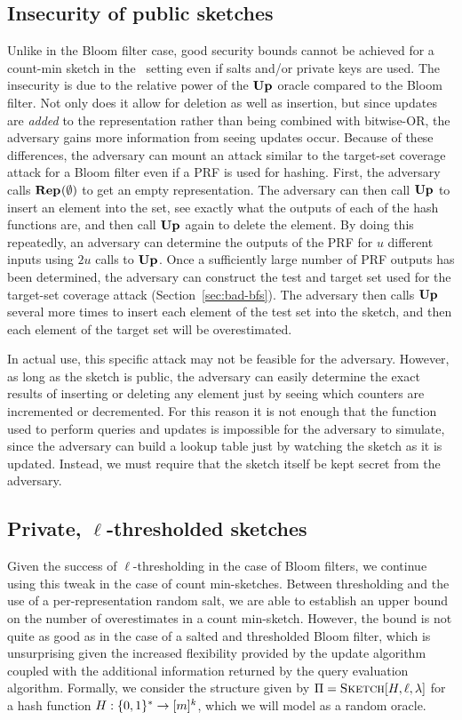 \subsection{Insecurity of public sketches}\label{sec:pub-sketch-bad}

Unlike in the Bloom filter case, good security bounds cannot be achieved for a
count-min sketch in the \errep\ setting even if salts and/or private keys are
used. The insecurity is due to the relative power of the $\textup{\textbf{Up}}\hspace{0.5pt}$ oracle compared
to the Bloom filter. Not only does it allow for deletion as well as
insertion, but since updates are \emph{added} to the representation rather than
being combined with bitwise-OR, the adversary gains more information from
seeing updates occur. Because of these differences, the adversary can mount
an attack similar to the target-set coverage attack for a Bloom filter even if a
PRF is used for
hashing. First, the adversary calls $\textup{\textbf{Rep}}\hspace{0.5pt}(\emptyset)$ to get an empty
representation. The adversary can then call $\textup{\textbf{Up}}\hspace{0.5pt}$ to insert an element into the
set, see exactly what the outputs of each of the hash functions are, and then
call $\textup{\textbf{Up}}\hspace{0.5pt}$ again to delete the element. By doing this repeatedly, an adversary
can determine the outputs of the PRF for $u$ different inputs using $2u$ calls
to $\textup{\textbf{Up}}\hspace{0.5pt}$. Once a sufficiently large number of PRF outputs has been determined,
the adversary can construct the test and target set used for the target-set
coverage attack (Section~\ref{sec:bad-bfs}). The adversary then calls $\textup{\textbf{Up}}\hspace{0.5pt}$ several more times to insert
each element of the test set into the sketch, and then
each element of the target set will be overestimated.

In actual use, this specific attack may not be feasible for the adversary.
However, as long as the sketch is public, the adversary can easily determine the
exact results of inserting or deleting any element just by seeing which counters
are incremented or decremented. For this reason it is not enough that the
function used to perform queries and updates is impossible for the adversary to
simulate, since the adversary can build a lookup table just by watching the
sketch as it is updated. Instead, we must require that the sketch itself be kept
secret from the adversary.

\subsection{Private, $\ell$-thresholded sketches}

Given the success of $\ell$-thresholding in the case of Bloom filters, we
continue using this tweak in the case of count min-sketches. Between
thresholding and the use of a per-representation random salt, we are able to
establish an upper bound on the number of overestimates in a count min-sketch.
However, the bound is not quite as good as in the case of a salted and
thresholded Bloom filter, which is unsurprising given the increased flexibility
provided by the update algorithm coupled with the additional
information returned by the query evaluation algorithm.
%
Formally, we consider the structure given by $\Pi = \textnormal{\textsc{Sketch}}[H,\ell,\lambda]$ for
a hash function $H: \{0,1\}^* \to [m]^k$, which we will model as a random oracle.

